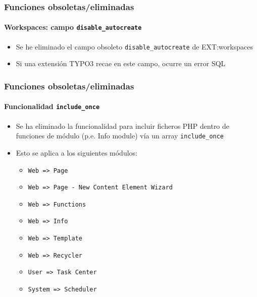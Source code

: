 \begin{frame}[fragile]
	\frametitle{Funciones obsoletas/eliminadas}
	\framesubtitle{Workspaces: campo \texttt{disable\_autocreate}}

	\begin{itemize}
		\item Se he eliminado el campo obsoleto \texttt{disable\_autocreate} de EXT:workspaces
		\item Si una extensión TYPO3 recae en este campo, ocurre un error SQL
	\end{itemize}

\end{frame}


\begin{frame}[fragile]
	\frametitle{Funciones obsoletas/eliminadas}
	\framesubtitle{Funcionalidad \texttt{include\_once}}

	\begin{itemize}

		\item Se ha eliminado la funcionalidad para incluir ficheros PHP dentro de funciones de módulo (p.e. Info module)
			vía un array \texttt{include\_once}

		\item Esto se aplica a los siguientes módulos:

			\begin{itemize}
				\item \texttt{Web => Page}
				\item \texttt{Web => Page - New Content Element Wizard}
				\item \texttt{Web => Functions}
				\item \texttt{Web => Info}
				\item \texttt{Web => Template}
				\item \texttt{Web => Recycler}
				\item \texttt{User => Task Center}
				\item \texttt{System => Scheduler}
			\end{itemize}

	\end{itemize}

\end{frame}

